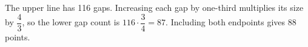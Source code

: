 The upper line has 116 gaps. Increasing each gap by one-third multiplies its size by $\dfrac{4}{3}$, so the lower gap count is $116\cdot\dfrac{3}{4}=87$. Including both endpoints gives $\boxed{88}$ points.
